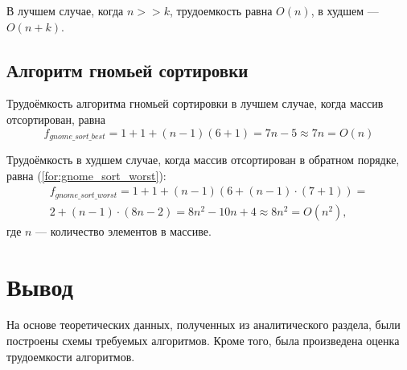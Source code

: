 В лучшем случае, когда $n >> k$, трудоемкость равна $O(n)$, в худшем --- $O(n + k)$.

\subsection{Алгоритм гномьей сортировки}

Трудоёмкость алгоритма гномьей сортировки в лучшем случае, когда массив отсортирован, равна
\begin{equation}
	\label{for:gnome_sort_best}
	f_{gnome\_sort\_best} = 1 + 1 + (n - 1)(6 + 1) = 7n - 5 \approx 7n = O(n)
\end{equation}

Трудоёмкость в худшем случае, когда массив отсортирован в обратном порядке, равна (\ref{for:gnome_sort_worst}):
\begin{equation}
	\label{for:gnome_sort_worst}
	\begin{array}{c}
	f_{gnome\_sort\_worst} = 1 + 1 + (n - 1)(6 + (n - 1) \cdot (7 + 1)) =\\ 2 + (n - 1) \cdot (8n - 2) = 8n^2 - 10n + 4 \approx 8n^2 = O(n^2), 
	\end{array}
\end{equation}
где $n$ --- количество элементов в массиве.

\section*{Вывод}

На основе теоретических данных, полученных из аналитического раздела,
были построены схемы требуемых алгоритмов. Кроме того, была произведена оценка трудоемкости алгоритмов.
